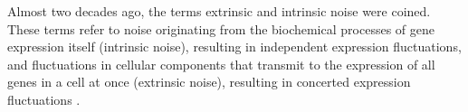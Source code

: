 Almost two decades ago, the terms extrinsic and intrinsic noise were coined.
%
These terms refer to noise originating from the biochemical processes of gene expression itself (intrinsic noise), resulting in independent expression fluctuations,
and fluctuations in cellular components that transmit to the expression of all genes in a cell at once (extrinsic noise), resulting in concerted expression fluctuations \cite{Elowitz2002}.






